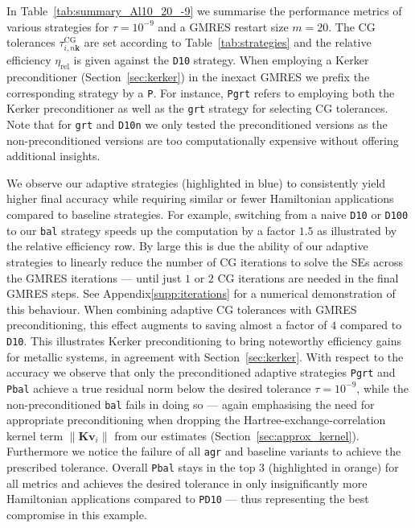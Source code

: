 \documentclass[hidelinks,onefignum,onetabnum]{siamart250211}
\newcommand{\taucg}{\tau^{\mathrm{CG}}}
\newcommand{\releta}{\eta_{\mathrm{rel}}}
\newcommand{\sbal}{\texttt{bal}\xspace}
\newcommand{\sagr}{\texttt{agr}\xspace}
\newcommand{\sgrt}{\texttt{grt}\xspace}
\newcommand{\sdten}{\texttt{D10}\xspace}
\newcommand{\sdhun}{\texttt{D100}\xspace}
\newcommand{\sdnorm}{\texttt{D10n}\xspace}
\newcommand{\sPbal}{\texttt{Pbal}\xspace}
\newcommand{\sPgrt}{\texttt{Pgrt}\xspace}
\newcommand{\sPdten}{\texttt{PD10}\xspace}
\newcommand{\supplement}{Appendix\xspace}
\newcommand{\supplement}{Supplementary Material\xspace}
\begin{document}
In Table~\ref{tab:summary_Al10_20_-9} we summarise the performance metrics
of various strategies for $\tau = 10^{-9}$ and a GMRES restart size $m=20$.
The CG tolerances
$\taucg_{i,n\bm k}$ are set according to Table~\ref{tab:strategies}
and the relative efficiency $\releta$ is given against the \sdten strategy.
When employing a Kerker preconditioner (Section~\ref{sec:kerker})
in the inexact GMRES we prefix the corresponding strategy
by a \texttt{P}. For instance, \sPgrt refers to employing both the Kerker
preconditioner as well as the \sgrt strategy for selecting CG tolerances.
Note that for \sgrt and \sdnorm we only tested the preconditioned versions
as the non-preconditioned versions are too computationally expensive
without offering additional insights.

We observe our adaptive strategies (highlighted in blue) to consistently yield
higher final accuracy while requiring similar or fewer Hamiltonian applications compared
to baseline strategies. For example, switching from a naive \sdten
or \sdhun to our \sbal strategy speeds up the computation by a factor $1.5$
as illustrated by the relative efficiency row.
By large this is due the ability of our adaptive strategies to linearly
reduce the number of CG iterations to solve the SEs across the GMRES iterations
--- until just $1$ or $2$ CG iterations are needed in the final GMRES steps.
See \supplement \ref{supp:iterations}
for a numerical demonstration of this behaviour.
When combining adaptive CG tolerances with GMRES preconditioning,
this effect augments to saving almost a factor of $4$ compared to \sdten.
This illustrates Kerker preconditioning to bring noteworthy efficiency gains
for metallic systems, in agreement with Section~\ref{sec:kerker}.
With respect to the accuracy we observe that only the preconditioned adaptive
strategies \sPgrt and \sPbal achieve a true residual norm below the desired
tolerance $\tau = 10^{-9}$, while the non-preconditioned \sbal fails in doing so
--- again emphasising the need for appropriate preconditioning
when dropping the Hartree-exchange-correlation kernel term $\| \bm{K} \bm{v}_i \|$
from our estimates (Section~\ref{sec:approx_kernel}).
%
Furthermore we notice the failure of all \sagr and baseline variants to achieve
the prescribed tolerance.
Overall \sPbal stays in the top $3$ (highlighted in orange) for all metrics
and achieves the desired tolerance in only insignificantly more
Hamiltonian applications compared to \sPdten
--- thus representing the best compromise in this example.

%
%
%
%
%
%
%
%
%
%
%
%
%
%
%
%
%
%
%
\end{document}
